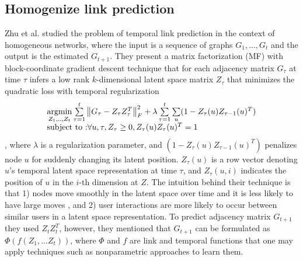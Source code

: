 
\subsection{Homogenize link prediction}

Zhu et al. \cite{Zhu2016} studied the problem of temporal link prediction in the context of homogeneous networks, where the input is a sequence of graphs $G_1, ..., G_t$ and the output is the estimated $G_{t+1}$. They present a matrix factorization (MF) with block-coordinate gradient descent technique that for each adjacency matrix $G_\tau$ at time $\tau$ infers a low rank $k$-dimensional latent space matrix $Z_\tau$ that minimizes the quadratic loss with temporal regularization
\begin{equation}\label{latentOrigEqu}
    \begin{array}{l}
\operatorname*{argmin}\limits_{Z_1, .., Z_t}\sum\limits_{\tau=1}^{t}\left \| G_\tau-Z_{\tau}Z_{\tau}^T \right \|^2_F+\lambda \sum\limits_{\tau=1}^{t}\sum\limits_{u}(1-Z_{\tau}(u)Z_{\tau-1}(u)^T) 
\\
\text{subject to :} \forall u,\tau,Z_{\tau}\geq 0, Z_{\tau}(u)Z_{\tau}(u)^T=1
    \end{array}
\end{equation}
, where $\lambda$ is a regularization parameter, and  $(1-Z_{\tau}(u)Z_{\tau-1}(u)^T)$ penalizes node $u$ for suddenly changing its latent position. %
$Z_\tau(u)$ is a row vector denoting $u$'s temporal latent space representation at time $\tau$, and $Z_\tau(u,i)$ indicates the position of $u$ in the $i$-th dimension at $Z$. The intuition behind their technique is that 1) nodes move smoothly in the latent space over time and it is less likely to have large moves \cite{sarkar2005dynamic,zhang2014inferring}, and 2) user interactions are more likely to occur between similar users in a latent space representation. To predict adjacency matrix $G_{t+1}$ they used $Z_tZ_t^T$, however, they mentioned that $G_{t+1}$ can be formulated as $\Phi(f(Z_1,...Z_t))$, where $\Phi$ and $f$ are link and temporal functions that one may apply techniques such as nonparametric approaches \cite{Sarkar:2012} to learn them.

